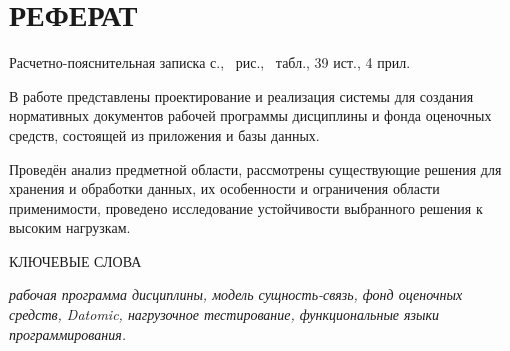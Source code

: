 \section*{РЕФЕРАТ}

Расчетно-пояснительная записка \pageref{LastPage} с., \totalfigures\ рис., \totaltables\ табл., 39 ист., 4 прил.

В работе представлены проектирование и реализация системы для создания нормативных документов рабочей программы дисциплины и фонда оценочных средств, состоящей из приложения и базы данных.

Проведён анализ предметной области, рассмотрены существующие решения для хранения и обработки данных, их особенности и ограничения области применимости, проведено исследование устойчивости выбранного решения к высоким нагрузкам.

КЛЮЧЕВЫЕ СЛОВА

\textit{рабочая программа дисциплины, модель сущность-связь, фонд оценочных средств, Datomic, нагрузочное тестирование, функциональные языки программирования.}

\clearpage